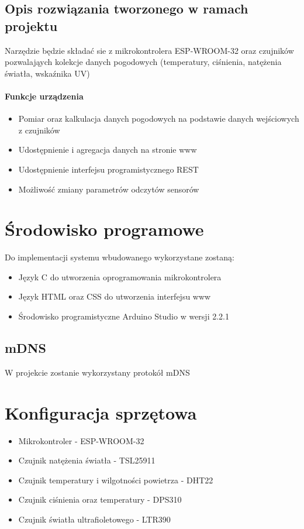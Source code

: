 \documentclass[12pt,a4paper]{article}
\begin{document}
\subsection{Opis rozwiązania tworzonego w ramach projektu}

Narzędzie będzie składać sie z mikrokontrolera ESP-WROOM-32 oraz czujników pozwalająych kolekcje danych pogodowych (temperatury, ciśnienia, natężenia światła, wskaźnika UV)

\paragraph{Funkcje urządzenia}
\begin{itemize}
    \item Pomiar oraz kalkulacja danych pogodowych na podstawie danych wejściowych z czujników
    \item Udostępnienie i agregacja danych na stronie www
    \item Udostępnienie interfejsu programistycznego REST
    \item Możliwość zmiany parametrów odczytów sensorów
\end{itemize}

\section{Środowisko programowe}
Do implementacji systemu wbudowanego wykorzystane zostaną:
\begin{itemize}
    \item Język C do utworzenia oprogramowania mikrokontrolera
    \item Język HTML oraz CSS do utworzenia interfejsu www
    \item Środowisko programistyczne Arduino Studio w wersji 2.2.1
\end{itemize}

\subsection{mDNS}

W projekcie zostanie wykorzystany protokół mDNS

\section{Konfiguracja sprzętowa}

\begin{itemize}
    \item Mikrokontroler - ESP-WROOM-32
    \item Czujnik natężenia światła - TSL25911
    \item Czujnik temperatury i wilgotności powietrza - DHT22
    \item Czujnik ciśnienia oraz temperatury - DPS310
    \item Czujnik światła ultrafioletowego - LTR390
\end{itemize}
\end{document}
